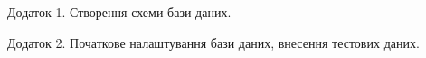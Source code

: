 \newpage


Додаток 1. Створення схеми бази даних.


\label{setup}Додаток 2. Початкове налаштування бази даних, внесення тестових даних.

